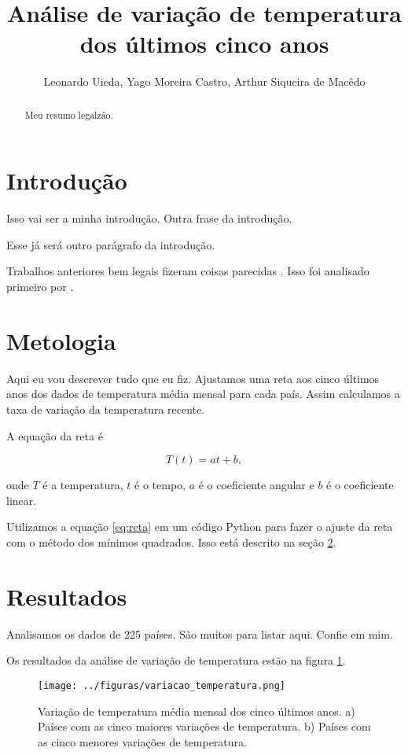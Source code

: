 \documentclass{article}
\begin{document}
\title{Análise de variação de temperatura dos últimos cinco anos}
\author{Leonardo Uieda, Yago Moreira Castro, Arthur Siqueira de Macêdo}

\maketitle

\begin{abstract}
Meu resumo legalzão.
\end{abstract}

\section{Introdução}

Isso vai ser a minha introdução.
Outra frase da introdução.

Esse já será outro parágrafo da introdução.

Trabalhos anteriores bem legais fizeram coisas parecidas
\citep{Hansen2010}.
Isso foi analisado primeiro por \citet{Hansen2010}.


\section{Metologia}
\label{sec:metodos}

Aqui eu vou descrever tudo que eu fiz.
Ajustamos uma reta aos cinco últimos anos dos dados
de temperatura média mensal para cada país.
Assim calculamos a taxa de variação da temperatura recente.

A equação da reta é

\begin{equation}
T(t) = a t + b,
\label{eq:reta}
\end{equation}

\noindent
onde $T$ é a temperatura, $t$ é o tempo, $a$ é o coeficiente angular 
e $b$ é o coeficiente linear.

Utilizamos a equação \ref{eq:reta} em um código Python para fazer o ajuste da 
reta com o método dos mínimos quadrados. 
Isso está descrito na seção \ref{sec:metodos}.

\section{Resultados}

Analisamos os dados de 225 países. São muitos para listar aqui. Confie em mim.

Os resultados da análise de variação de temperatura estão na figura \ref{fig:variacao}.

\begin{figure}[!tb]
    \centering
    \texttt{[image: ../figuras/variacao\_temperatura.png]}
    \caption{
        Variação de temperatura média mensal dos cinco últimos anos. 
        a) Países com as cinco maiores variações de temperatura.
        b) Países com as cinco menores variações de temperatura.
    }
    \label{fig:variacao}
\end{figure}




\end{document}
